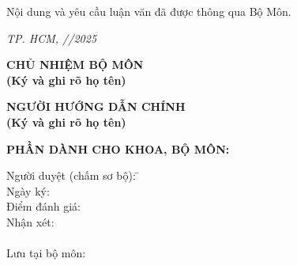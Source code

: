 \vspace{0.4cm}
\noindent
Nội dung và yêu cầu luận văn đã được thông qua Bộ Môn.

\vspace{0.3cm}
\noindent
\hfill \textit{TP. HCM, \dotfill/\dotfill/2025}

\vspace{0.5cm}
\begin{center}
\begin{minipage}[t]{0.48\textwidth}
\centering
\textbf{CHỦ NHIỆM BỘ MÔN} \\[1.5cm]
\textbf{\small (Ký và ghi rõ họ tên)}
\end{minipage}
\hfill
\begin{minipage}[t]{0.48\textwidth}
\centering
\textbf{NGƯỜI HƯỚNG DẪN CHÍNH} \\[1.5cm]
\textbf{\small (Ký và ghi rõ họ tên)}
\end{minipage}
\end{center}

\vspace{0.3cm}
\noindent
\textbf{PHẦN DÀNH CHO KHOA, BỘ MÔN:}

\small
\begin{tabbing}
Người duyệt (chấm sơ bộ): \= \dotfill \\
Ngày ký: \> \dotfill \\
Điểm đánh giá: \> \dotfill \\
Nhận xét: \> \dotfill \\
\phantom{Nhận xét: } \> \dotfill \\
Lưu tại bộ môn: \> \dotfill
\end{tabbing}

\clearpage
